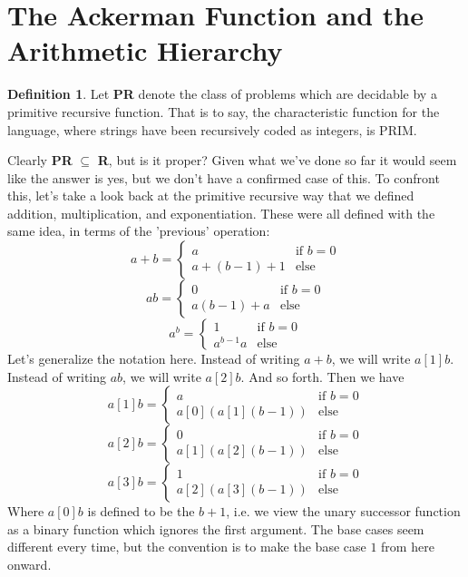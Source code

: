 \documentclass{article}
\theoremstyle{definition}
\newtheorem{definition}{Definition}[section]
\theoremstyle{plain}
\theoremstyle{theorem}
\begin{document}
\section{The Ackerman Function and the Arithmetic Hierarchy}
\begin{definition} 
    Let \textbf{PR} denote the class of problems which are decidable by a primitive recursive function. That is to say, the characteristic function for the language, where strings have been recursively coded as integers, is PRIM.
\end{definition}
Clearly \textbf{PR} $\subseteq$ \textbf{R}, but is it proper? Given what we've done so far it would seem like the answer is yes, but we don't have a confirmed case of this. To confront this, let's take a look back at the primitive recursive way that we defined addition, multiplication, and exponentiation. These were all defined with the same idea, in terms of the 'previous' operation:
\[a+b = \begin{cases}
			a & \textrm{if } b=0 \\ 
			a+(b-1)+1 & \textrm{else }
			\end{cases} \]
\[ab = \begin{cases}
			0 & \textrm{if } b=0 \\
			a(b-1)+a & \textrm{else}
			\end{cases} \]
\[a^b = \begin{cases}
			1 & \textrm{if } b=0 \\
			a^{b-1}a & \textrm{else }
			\end{cases} \]
Let's generalize the notation here. Instead of writing $a+b$, we will write $a[1]b$. Instead of writing $ab$, we will write $a[2]b$. And so forth. Then we have
\[a[1]b = \begin{cases}
			a & \textrm{if } b=0 \\ 
			a[0](a[1](b-1)) & \textrm{else }
			\end{cases} \]
\[a[2]b = \begin{cases}
			0 & \textrm{if } b=0 \\
			a[1](a[2](b-1)) & \textrm{else}
			\end{cases} \]
\[a[3]b = \begin{cases}
			1 & \textrm{if } b=0 \\
			a[2](a[3](b-1)) & \textrm{else }
			\end{cases} \]
Where $a[0]b$ is defined to be the $b+1$, i.e. we view the unary successor function as a binary function which ignores the first argument. The base cases seem different every time, but the convention is to make the base case $1$ from here onward. 
\end{document}
